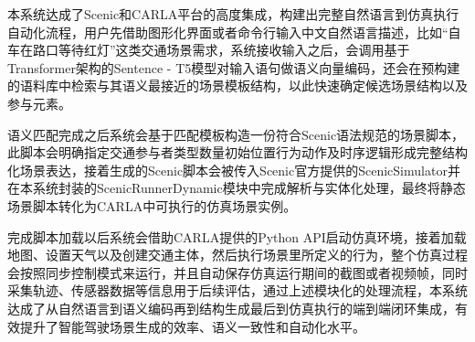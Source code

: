 本系统达成了Scenic和CARLA平台的高度集成，构建出完整自然语言到仿真执行自动化流程，用户先借助图形化界面或者命令行输入中文自然语言描述，比如“自车在路口等待红灯”这类交通场景需求，系统接收输入之后，会调用基于Transformer架构的Sentence - T5模型对输入语句做语义向量编码，还会在预构建的语料库中检索与其语义最接近的场景模板结构，以此快速确定候选场景结构以及参与元素。

语义匹配完成之后系统会基于匹配模板构造一份符合Scenic语法规范的场景脚本，此脚本会明确指定交通参与者类型数量初始位置行为动作及时序逻辑形成完整结构化场景表达，接着生成的Scenic脚本会被传入Scenic官方提供的ScenicSimulator并在本系统封装的ScenicRunnerDynamic模块中完成解析与实体化处理，最终将静态场景脚本转化为CARLA中可执行的仿真场景实例。

完成脚本加载以后系统会借助CARLA提供的Python API启动仿真环境，接着加载地图、设置天气以及创建交通主体，然后执行场景里所定义的行为，整个仿真过程会按照同步控制模式来运行，并且自动保存仿真运行期间的截图或者视频帧，同时采集轨迹、传感器数据等信息用于后续评估，通过上述模块化的处理流程，本系统达成了从自然语言到语义编码再到结构生成最后到仿真执行的端到端闭环集成，有效提升了智能驾驶场景生成的效率、语义一致性和自动化水平。



